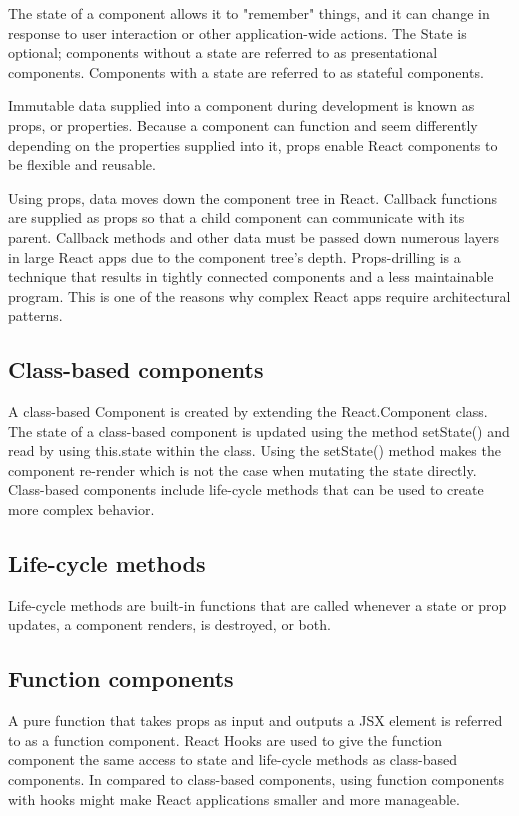 The state of a component allows it to "remember" things, and it can change in response to user interaction or other application-wide actions. The State is optional; components without a state are referred to as presentational components. Components with a state are referred to as stateful components.

Immutable data supplied into a component during development is known as props, or properties. Because a component can function and seem differently depending on the properties supplied into it, props enable React components to be flexible and reusable.

Using props, data moves down the component tree in React. Callback functions are supplied as props so that a child component can communicate with its parent. Callback methods and other data must be passed down numerous layers in large React apps due to the component tree's depth. Props-drilling is a technique that results in tightly connected components and a less maintainable program. This is one of the reasons why complex React apps require architectural patterns.

\subsection{Class-based components}

A class-based Component is created by extending the React.Component class. The state of a class-based component is updated using the method setState() and read by using this.state within the class. Using the setState() method makes the component re-render which is not the case when mutating the state directly. Class-based components include life-cycle methods that can be used to create more complex behavior.

\subsection{Life-cycle methods}

Life-cycle methods are built-in functions that are called whenever a state or prop updates, a component renders, is destroyed, or both.

\subsection{Function components}

A pure function that takes props as input and outputs a JSX element is referred to as a function component. React Hooks are used to give the function component the same access to state and life-cycle methods as class-based components. In compared to class-based components, using function components with hooks might make React applications smaller and more manageable.

